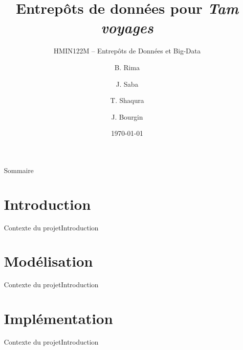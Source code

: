 \documentclass[usenames,dvipsnames]{beamer}
\title{Entrepôts de données pour \textit{Tam voyages}}
\subtitle{HMIN122M -- Entrepôts de Données et Big-Data}
\author{B. Rima \and J. Saba \and T. Shaqura \and J. Bourgin}
\institute[UM]{M1 Informatique AIGLE}
\date{\today}
\begin{document}
\begin{frame}
\titlepage
\end{frame}
\begin{frame}{Sommaire}
\tableofcontents
\end{frame}
\section{Introduction}
\begin{frame}{Contexte du projet}{Introduction}
\end{frame}

\section{Modélisation}
\begin{frame}{Contexte du projet}{Introduction}
\end{frame}

\section{Implémentation}
\begin{frame}{Contexte du projet}{Introduction}
\end{frame}
\end{document}
